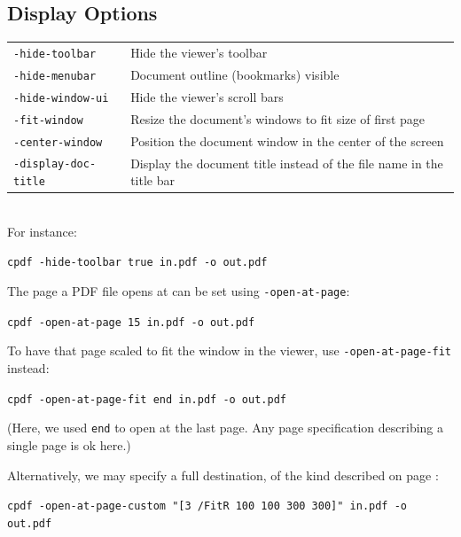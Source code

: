 \documentclass{book}
\begin{document}
  \subsection{Display Options}
\vspace{2mm}
  {\small\begin{tabular}{ll}
    \texttt{-hide-toolbar} & \vspace{2mm} \parbox{8cm}{Hide the viewer's toolbar} \\
    \texttt{-hide-menubar} & \vspace{2mm} \parbox{8cm}{Document outline (bookmarks) visible} \\
    \texttt{-hide-window-ui} & \vspace{2mm} \parbox{8cm}{Hide the viewer's scroll bars} \\
    \texttt{-fit-window} & \vspace{2mm} \parbox{8cm}{Resize the document's windows to fit size of first page} \\
    \texttt{-center-window} & \vspace{2mm} \parbox{8cm}{Position the document window in the center of the screen} \\
    \texttt{-display-doc-title} & \vspace{2mm} \parbox{8cm}{Display the document title instead of the file name in the title bar}
  \end{tabular}}\\

  \noindent For instance:
  \begin{framed}
    \noindent\small\verb!cpdf -hide-toolbar true in.pdf -o out.pdf!
  \end{framed}

\noindent The page a PDF file opens at can be set using \texttt{-open-at-page}:
  \begin{framed}
    \noindent\small\verb!cpdf -open-at-page 15 in.pdf -o out.pdf!
  \end{framed}

\noindent To have that page scaled to fit the window in the viewer, use \texttt{-open-at-page-fit} instead:
  \begin{framed}
    \noindent\small\verb!cpdf -open-at-page-fit end in.pdf -o out.pdf!
  \end{framed}

\noindent (Here, we used \texttt{end} to open at the last page. Any page specification describing a single page is ok here.)

Alternatively, we may specify a full destination, of the kind described on page \pageref{destinations}:
  \begin{framed}
    \noindent\small\verb!cpdf -open-at-page-custom "[3 /FitR 100 100 300 300]" in.pdf -o out.pdf!
  \end{framed}
\end{document}

